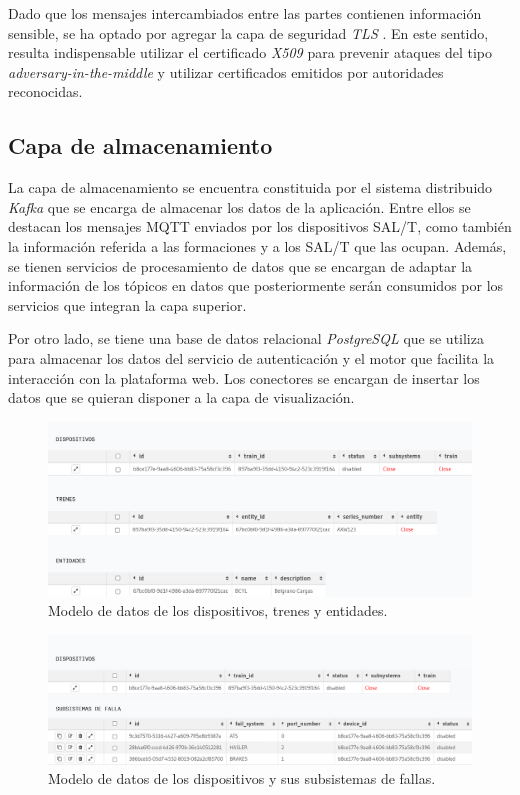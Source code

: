 \documentclass[a4paper]{IEEEtran}
\begin{document}
Dado que los mensajes intercambiados entre las partes contienen información sensible, se ha optado por agregar la capa de seguridad \textit{TLS} \cite{b8}. En este sentido, resulta indispensable utilizar el certificado \textit{X509} \cite{b9} para prevenir ataques del tipo \textit{adversary-in-the-middle} \cite{b10} y utilizar certificados emitidos por autoridades reconocidas.


\subsection{Capa de almacenamiento}

La capa de almacenamiento se encuentra constituida por el sistema distribuido \textit{Kafka} que se encarga de almacenar los datos de la aplicación. Entre ellos se destacan los mensajes MQTT enviados por los dispositivos SAL/T, como también la información referida a las formaciones y a los SAL/T que las ocupan. Además, se tienen servicios de procesamiento de datos que se encargan de adaptar la información de los tópicos en datos que posteriormente serán consumidos por los servicios que integran la capa superior.

Por otro lado, se tiene una base de datos relacional \textit{PostgreSQL} \cite{b11} que se utiliza para almacenar los datos del servicio de autenticación y el motor que facilita la interacción con la plataforma web. Los conectores se encargan de insertar los datos que se quieran disponer a la capa de visualización.

\begin{figure}[ht]
\centering 
\includegraphics[width=.5\textwidth]{images/salt_table_v2.1.jpg}
\caption{Modelo de datos de los dispositivos, trenes y entidades.}
\label{fig:devicesTrainEntity}
\end{figure}

\begin{figure}[ht]
\centering 
\includegraphics[width=.5\textwidth]{images/fail_system_v2.1.jpg}
\caption{Modelo de datos de los dispositivos y sus subsistemas de fallas.}
\label{fig:devicesSubsystems}
\end{figure}
\end{document}
